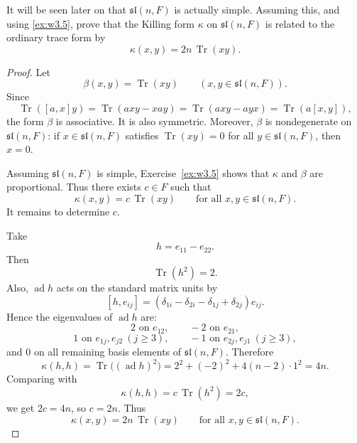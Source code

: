 \begin{exercise}
    It will be seen later on that $\mathfrak{sl}(n,F)$ is actually simple. Assuming this, and using \ref{ex:w3.5}, prove that the Killing form $\kappa$ on $\mathfrak{sl}(n,F)$ is related to the ordinary trace form by
    \[
        \kappa(x,y)=2n\,\operatorname{Tr}(xy).
    \]
\end{exercise}

\begin{proof}
    Let
    \[
        \beta(x,y)=\operatorname{Tr}(xy)
        \qquad (x,y\in \mathfrak{sl}(n,F)).
    \]
    Since
    \[
        \operatorname{Tr}([a,x]y)=\operatorname{Tr}(a x y-x a y)
        =\operatorname{Tr}(a x y-a y x)
        =\operatorname{Tr}(a[x,y]),
    \]
    the form $\beta$ is associative. It is also symmetric. Moreover, $\beta$ is nondegenerate on $\mathfrak{sl}(n,F)$: if $x\in \mathfrak{sl}(n,F)$ satisfies $\operatorname{Tr}(xy)=0$ for all $y\in \mathfrak{sl}(n,F)$, then $x=0$.

    Assuming $\mathfrak{sl}(n,F)$ is simple, Exercise~\ref{ex:w3.5} shows that $\kappa$ and $\beta$ are proportional. Thus there exists $c\in F$ such that
    \[
        \kappa(x,y)=c\,\operatorname{Tr}(xy)
        \qquad\text{for all }x,y\in \mathfrak{sl}(n,F).
    \]
    It remains to determine $c$.

    Take
    \[
        h=e_{11}-e_{22}.
    \]
    Then
    \[
        \operatorname{Tr}(h^2)=2.
    \]
    Also, $\operatorname{ad} h$ acts on the standard matrix units by
    \[
        [h,e_{ij}]=(\delta_{1i}-\delta_{2i}-\delta_{1j}+\delta_{2j})e_{ij}.
    \]
    Hence the eigenvalues of $\operatorname{ad} h$ are:
    \[
        2 \text{ on } e_{12}, \qquad -2 \text{ on } e_{21},
    \]
    \[
        1 \text{ on } e_{1j},e_{j2}\ (j\ge 3), \qquad -1 \text{ on } e_{2j},e_{j1}\ (j\ge 3),
    \]
    and \(0\) on all remaining basis elements of \(\mathfrak{sl}(n,F)\). Therefore
    \[
        \kappa(h,h)=\operatorname{Tr}\bigl((\operatorname{ad} h)^2\bigr)
        =2^2+(-2)^2+4(n-2)\cdot 1^2=4n.
    \]
    Comparing with
    \[
        \kappa(h,h)=c\,\operatorname{Tr}(h^2)=2c,
    \]
    we get \(2c=4n\), so \(c=2n\). Thus
    \[
        \kappa(x,y)=2n\,\operatorname{Tr}(xy)
        \qquad\text{for all }x,y\in \mathfrak{sl}(n,F).
    \]
\end{proof}














